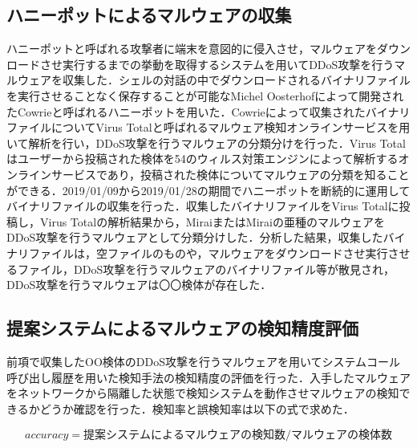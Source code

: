 \subsection{ハニーポットによるマルウェアの収集}
ハニーポットと呼ばれる攻撃者に端末を意図的に侵入させ，マルウェアをダウンロードさせ実行するまでの挙動を取得するシステムを用いてDDoS攻撃を行うマルウェアを収集した．シェルの対話の中でダウンロードされるバイナリファイルを実行させることなく保存することが可能なMichel Oosterhofによって開発されたCowrieと呼ばれるハニーポットを用いた．Cowrieによって収集されたバイナリファイルについてVirus Totalと呼ばれるマルウェア検知オンラインサービスを用いて解析を行い，DDoS攻撃を行うマルウェアの分類分けを行った．Virus Totalはユーザーから投稿された検体を54のウィルス対策エンジンによって解析するオンラインサービスであり，投稿された検体についてマルウェアの分類を知ることができる．2019/01/09から2019/01/28の期間でハニーポットを断続的に運用してバイナリファイルの収集を行った．収集したバイナリファイルをVirus Totalに投稿し，Virus Totalの解析結果から，MiraiまたはMiraiの亜種のマルウェアをDDoS攻撃を行うマルウェアとして分類分けした．分析した結果，収集したバイナリファイルは，空ファイルのものや，マルウェアをダウンロードさせ実行させるファイル，DDoS攻撃を行うマルウェアのバイナリファイル等が散見され，DDoS攻撃を行うマルウェアは〇〇検体が存在した．

\subsection{提案システムによるマルウェアの検知精度評価}
前項で収集したOO検体のDDoS攻撃を行うマルウェアを用いてシステムコール呼び出し履歴を用いた検知手法の検知精度の評価を行った．入手したマルウェアをネットワークから隔離した状態で検知システムを動作させマルウェアの検知できるかどうか確認を行った．検知率と誤検知率は以下の式で求めた．

\begin{equation}
    accuracy = 提案システムによるマルウェアの検知数/マルウェアの検体数
\end{equation}